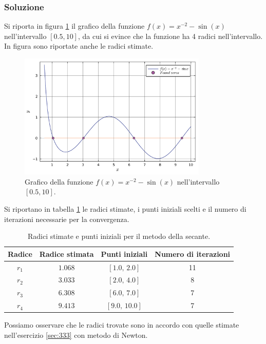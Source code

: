\documentclass[letterpaper, 12pt]{article}
\begin{document}
\subsubsection{Soluzione}
Si riporta in figura \ref{fig:es3_4_3_1} il grafico della funzione $f(x)=x^{-2}-\sin(x)$ nell'intervallo
$[0.5,10]$, da cui si evince che la funzione ha 4 radici nell'intervallo. In figura sono riportate anche
le radici stimate.
\begin{figure}[!ht]
    \centering
    \includegraphics[width=0.8\textwidth]{3431.pdf}
    \caption{Grafico della funzione $f(x)=x^{-2}-\sin(x)$ nell'intervallo $[0.5,10]$.}
    \label{fig:es3_4_3_1}
\end{figure}

Si riportano in tabella \ref{tab:es3_4_3_1} le radici stimate, i punti iniziali scelti e il numero di iterazioni
necessarie per la convergenza.
\begin{table}[!ht]
    \centering
    \begin{tabular}{|c|c|c|c|}
        \hline
        \textbf{Radice} & \textbf{Radice stimata} & \textbf{Punti iniziali} & \textbf{Numero di iterazioni} \\
        \hline
        $r_1$ & $1.068$  & $[1.0,\,2.0]$   & 11  \\
        $r_2$ & $3.033$  & $[2.0,\,4.0]$   & 8  \\
        $r_3$ & $6.308$  & $[6.0,\,7.0]$   & 7  \\
        $r_4$ & $9.413$  & $[9.0,\,10.0]$  & 7  \\
        \hline
    \end{tabular}
    \caption{Radici stimate e punti iniziali per il metodo della secante.}
    \label{tab:es3_4_3_1}
\end{table}
Possiamo osservare che le radici trovate sono in accordo con quelle stimate nell'esercizio \ref{sec:333} 
con metodo di Newton.
\end{document}
